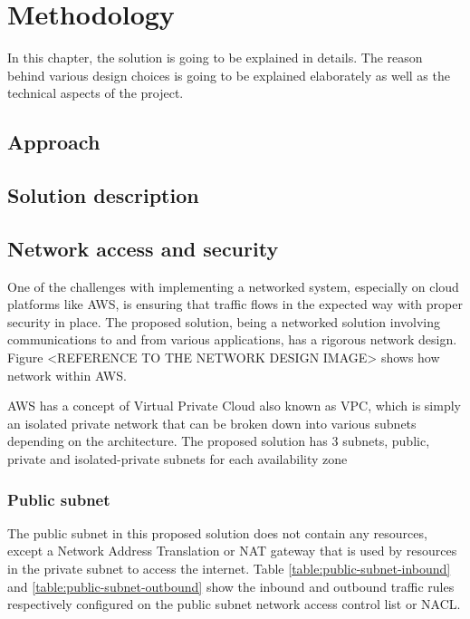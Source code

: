 
\chapter{Methodology}
In this chapter, the solution is going to be explained in details. The reason behind various design choices is going to be explained elaborately as well as the technical aspects of the project.

\section{Approach}


\section{Solution description}


\section{Network access and security}
One of the challenges with implementing a networked system, especially on cloud platforms like AWS, is ensuring that traffic flows in the expected way with proper security in place. The proposed solution, being a networked solution involving communications to and from various applications, has a rigorous network design. Figure <REFERENCE TO THE NETWORK DESIGN IMAGE> shows how network within AWS.

AWS has a concept of Virtual Private Cloud also known as VPC, which is simply an isolated private network that can be broken down into various subnets depending on the architecture. The proposed solution has 3 subnets, public, private and isolated-private subnets for each availability zone

\subsection{Public subnet}
\label{public-subnet}
The public subnet in this proposed solution does not contain any resources, except a Network Address Translation or NAT gateway that is used by resources in the private subnet to access the internet. Table \ref{table:public-subnet-inbound} and \ref{table:public-subnet-outbound} show the inbound and outbound traffic rules respectively configured on the public subnet network access control list or NACL.

